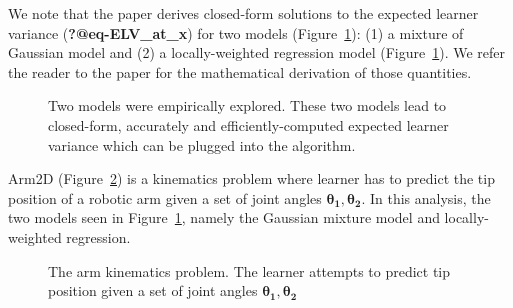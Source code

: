 \documentclass[
  letterpaper,
  numbers=noenddot,
  DIV=11,
  oneside]{scrreprt}
\theoremstyle{remark}
\begin{document}
We note that the paper derives closed-form solutions to the expected
learner variance (\textbf{?@eq-ELV\_at\_x}) for two models
(Figure~\ref{fig-two_models}): (1) a mixture of Gaussian model and (2) a
locally-weighted regression model (Figure~\ref{fig-two_models}). We
refer the reader to the paper for the mathematical derivation of those
quantities.

\begin{figure}


\caption{\label{fig-two_models}Two models were empirically explored.
These two models lead to closed-form, accurately and
efficiently-computed expected learner variance which can be plugged into
the algorithm.}

\end{figure}%

Arm2D (Figure~\ref{fig-arm2D}) is a kinematics problem where learner has
to predict the tip position of a robotic arm given a set of joint angles
\(\mathbf{\theta_1}, \mathbf{\theta_2}\). In this analysis, the two
models seen in Figure~\ref{fig-two_models}, namely the Gaussian mixture
model and locally-weighted regression.

\begin{figure}


\caption{\label{fig-arm2D}The arm kinematics problem. The learner
attempts to predict tip position given a set of joint angles
\(\mathbf{\theta_1}, \mathbf{\theta_2}\)}

\end{figure}%
\end{document}

